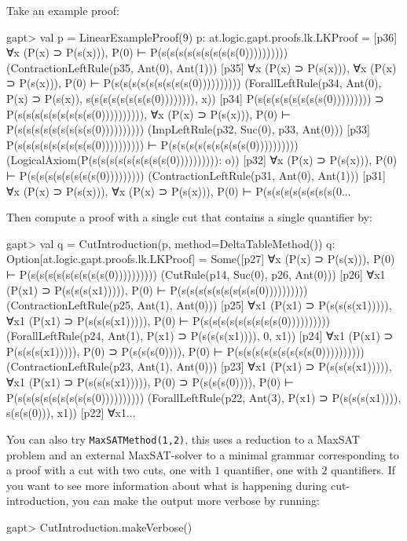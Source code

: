 \documentclass[a4paper,11pt]{article}
\begin{document}
Take an example proof:
\begin{clilisting}
gapt> val p = LinearExampleProof(9)
p: at.logic.gapt.proofs.lk.LKProof =
[p36] ∀x (P(x) ⊃ P(s(x))), P(0) ⊢ P(s(s(s(s(s(s(s(s(s(0))))))))))    (ContractionLeftRule(p35, Ant(0), Ant(1)))
[p35] ∀x (P(x) ⊃ P(s(x))),
∀x (P(x) ⊃ P(s(x))),
P(0)
⊢
P(s(s(s(s(s(s(s(s(s(0))))))))))    (ForallLeftRule(p34, Ant(0), P(x) ⊃ P(s(x)), s(s(s(s(s(s(s(s(0)))))))), x))
[p34] P(s(s(s(s(s(s(s(s(0))))))))) ⊃ P(s(s(s(s(s(s(s(s(s(0)))))))))),
∀x (P(x) ⊃ P(s(x))),
P(0)
⊢
P(s(s(s(s(s(s(s(s(s(0))))))))))    (ImpLeftRule(p32, Suc(0), p33, Ant(0)))
[p33] P(s(s(s(s(s(s(s(s(s(0)))))))))) ⊢ P(s(s(s(s(s(s(s(s(s(0))))))))))    (LogicalAxiom(P(s(s(s(s(s(s(s(s(s(0)))))))))): o))
[p32] ∀x (P(x) ⊃ P(s(x))), P(0) ⊢ P(s(s(s(s(s(s(s(s(0)))))))))    (ContractionLeftRule(p31, Ant(0), Ant(1)))
[p31] ∀x (P(x) ⊃ P(s(x))),
∀x (P(x) ⊃ P(s(x))),
P(0)
⊢
P(s(s(s(s(s(s(s(s(0...
\end{clilisting}
Then compute a proof with a single cut that contains a single quantifier by:
\begin{clilisting}
gapt> val q = CutIntroduction(p, method=DeltaTableMethod())
q: Option[at.logic.gapt.proofs.lk.LKProof] =
Some([p27] ∀x (P(x) ⊃ P(s(x))), P(0) ⊢ P(s(s(s(s(s(s(s(s(s(0))))))))))    (CutRule(p14, Suc(0), p26, Ant(0)))
[p26] ∀x1 (P(x1) ⊃ P(s(s(s(x1))))), P(0) ⊢ P(s(s(s(s(s(s(s(s(s(0))))))))))    (ContractionLeftRule(p25, Ant(1), Ant(0)))
[p25] ∀x1 (P(x1) ⊃ P(s(s(s(x1))))),
∀x1 (P(x1) ⊃ P(s(s(s(x1))))),
P(0)
⊢
P(s(s(s(s(s(s(s(s(s(0))))))))))    (ForallLeftRule(p24, Ant(1), P(x1) ⊃ P(s(s(s(x1)))), 0, x1))
[p24] ∀x1 (P(x1) ⊃ P(s(s(s(x1))))),
P(0) ⊃ P(s(s(s(0)))),
P(0)
⊢
P(s(s(s(s(s(s(s(s(s(0))))))))))    (ContractionLeftRule(p23, Ant(1), Ant(0)))
[p23] ∀x1 (P(x1) ⊃ P(s(s(s(x1))))),
∀x1 (P(x1) ⊃ P(s(s(s(x1))))),
P(0) ⊃ P(s(s(s(0)))),
P(0)
⊢
P(s(s(s(s(s(s(s(s(s(0))))))))))    (ForallLeftRule(p22, Ant(3), P(x1) ⊃ P(s(s(s(x1)))), s(s(s(0))), x1))
[p22] ∀x1...
\end{clilisting}

You can also try \texttt{MaxSATMethod(1,2)}, this uses a reduction to a MaxSAT
problem and an external MaxSAT-solver to a
minimal grammar corresponding to a proof with a cut with two cuts, one with $1$
quantifier, one with $2$ quantifiers.  If you want to see more information
about what is happening during cut-introduction, you can make the output more
verbose by running:

\begin{clilisting}
gapt> CutIntroduction.makeVerbose()

\end{clilisting}
\end{document}
